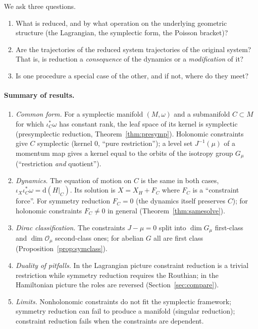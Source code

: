 \documentclass[11pt,a4paper]{article}
\numberwithin{equation}{section}
\theoremstyle{plain}
\theoremstyle{definition}
\theoremstyle{remark}
\newcommand{\dd}{\mathrm{d}}
\begin{document}
We ask three questions.
\begin{enumerate}[label=(Q\arabic*)]
\item What is reduced, and by what operation on the underlying geometric structure (the Lagrangian, the symplectic form, the Poisson bracket)?
\item Are the trajectories of the reduced system trajectories of the original system? That is, is reduction a \emph{consequence} of the dynamics or a \emph{modification} of it?
\item Is one procedure a special case of the other, and if not, where do they meet?
\end{enumerate}

\paragraph{Summary of results.}
\begin{enumerate}[label=(R\arabic*)]
\item \emph{Common form.} For a symplectic manifold $(M,\omega)$ and a submanifold $C\subset M$ for which $\iota_C^*\omega$ has constant rank, the leaf space of its kernel is symplectic (presymplectic reduction, Theorem~\ref{thm:presymp}). Holonomic constraints give $C$ symplectic (kernel $0$, ``pure restriction''); a level set $J^{-1}(\mu)$ of a momentum map gives a kernel equal to the orbits of the isotropy group $G_\mu$ (``restriction \emph{and} quotient'').
\item \emph{Dynamics.} The equation of motion on $C$ is the same in both cases, $\iota_X\iota_C^*\omega=\dd(H|_C)$. Its solution is $X=X_H+F_C$ where $F_C$ is a ``constraint force''. For symmetry reduction $F_C=0$ (the dynamics itself preserves $C$); for holonomic constraints $F_C\neq0$ in general (Theorem~\ref{thm:samesolve}).
\item \emph{Dirac classification.} The constraints $J-\mu=0$ split into $\dim G_\mu$ first-class and $\dim\mathcal O_\mu$ second-class ones; for abelian $G$ all are first class (Proposition~\ref{prop:symclass}).
\item \emph{Duality of pitfalls.} In the Lagrangian picture constraint reduction is a trivial restriction while symmetry reduction requires the Routhian; in the Hamiltonian picture the roles are reversed (Section~\ref{sec:compare}).
\item \emph{Limits.} Nonholonomic constraints do not fit the symplectic framework; symmetry reduction can fail to produce a manifold (singular reduction); constraint reduction fails when the constraints are dependent.
\end{enumerate}
\end{document}
